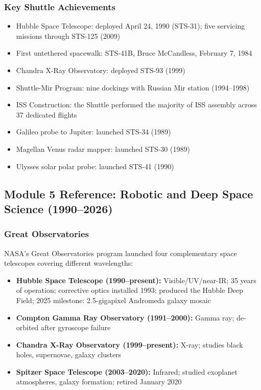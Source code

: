 \documentclass[11pt,letterpaper]{article}
\begin{document}
\subsubsection{Key Shuttle Achievements}

\begin{itemize}[leftmargin=*]
  \item Hubble Space Telescope: deployed April 24, 1990 (STS-31); five servicing missions through STS-125 (2009)
  \item First untethered spacewalk: STS-41B, Bruce McCandless, February 7, 1984
  \item Chandra X-Ray Observatory: deployed STS-93 (1999)
  \item Shuttle-Mir Program: nine dockings with Russian Mir station (1994--1998)
  \item ISS Construction: the Shuttle performed the majority of ISS assembly across 37 dedicated flights
  \item Galileo probe to Jupiter: launched STS-34 (1989)
  \item Magellan Venus radar mapper: launched STS-30 (1989)
  \item Ulysses solar polar probe: launched STS-41 (1990)
\end{itemize}

\subsection{Module 5 Reference: Robotic and Deep Space Science (1990--2026)}

\subsubsection{Great Observatories}

NASA's Great Observatories program launched four complementary space telescopes covering different wavelengths:
\begin{itemize}[leftmargin=*]
  \item \textbf{Hubble Space Telescope (1990--present):} Visible/UV/near-IR; 35 years of operation; corrective optics installed 1993; produced the Hubble Deep Field; 2025 milestone: 2.5-gigapixel Andromeda galaxy mosaic
  \item \textbf{Compton Gamma Ray Observatory (1991--2000):} Gamma ray; de-orbited after gyroscope failure
  \item \textbf{Chandra X-Ray Observatory (1999--present):} X-ray; studies black holes, supernovae, galaxy clusters
  \item \textbf{Spitzer Space Telescope (2003--2020):} Infrared; studied exoplanet atmospheres, galaxy formation; retired January 2020
\end{itemize}
\end{document}
